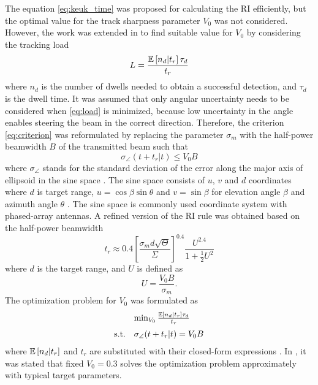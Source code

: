 \documentclass[english, 12pt, a4paper, elec, utf8, a-1b, online]{aaltothesis}
\numberwithin{equation}{section}
\newcommand{\E}[1]{\mathbb{E}\left[ #1 \right]}
\newcommand{\ri}{t_r}
\begin{document}
The equation \eqref{eq:keuk_time} was proposed for calculating the RI efficiently, but the optimal value for the track sharpness parameter $V_0$ was not considered.
However, the work was extended in \cite{vanKeuk1993} to find suitable value for $V_0$ by considering the tracking load
\begin{equation}\label{eq:load}
    L = \frac{\E{\ndwells | \ri} \tau_d}{\ri}
\end{equation}
where $n_d$ is the number of dwells needed to obtain a successful detection, and $\tau_d$ is the dwell time.
It was assumed that only angular uncertainty needs to be considered when \eqref{eq:load} is minimized, 
because low uncertainty in the angle enables steering the beam in the correct direction.
Therefore, the criterion \eqref{eq:criterion} was reformulated by replacing the parameter $\sigma_m$ with the half-power beamwidth $B$ of the transmitted beam such that
\begin{equation} \label{eq:criterion2}
    \sigma_\angle(t + \ri | t) \leq V_0 B
\end{equation}
where $\sigma_\angle$ stands for the standard deviation of the error along the major axis of ellipsoid in the sine space \cite{vanKeuk1993}.
The sine space consists of $u$, $v$ and $d$ coordinates where $d$ is target range, $u=\cos \beta \sin \theta$ and $v=\sin \beta$ for elevation angle $\beta$ and azimuth angle $\theta$ \cite{Mailloux2017}.
The sine space is commonly used coordinate system with phased-array antennas.
A refined version of the RI rule was obtained based on the half-power beamwidth
\begin{equation}\label{eq:van_keuk_revisited}
    \ri \approx 0.4 \left[ \frac{\sigma_m d \sqrt{\Theta}}{\Sigma} \right]^{0.4} \frac{U^{2.4}}{1+\frac{1}{2}U^2}
\end{equation}
where $d$ is the target range, and $U$ is defined as
\begin{equation}
    U = \frac{V_0 B}{\sigma_m}.
\end{equation}
The optimization problem for $V_0$ was formulated as 
\begin{equation}
\begin{array}{ll}
     & \min_{V_0} \frac{\E{\ndwells | \ri} \tau_d}{\ri} \\ [7pt]
    \text{s.t.} & \sigma_\angle(t + \ri | t) = V_0 B
\end{array}
\end{equation}
where $\E{\ndwells | \ri}$ and $\ri$ are substituted with their closed-form expressions \cite{vanKeuk1993}.
In \cite{vanKeuk1993}, it was stated that fixed $V_0=0.3$ solves the optimization problem approximately with typical target parameters.
\end{document}
